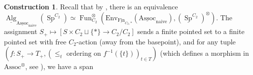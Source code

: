 \documentclass{article}
\DeclareMathOperator{\Alg}{Alg}
\DeclareMathOperator{\Fun}{Fun} %
\DeclareMathOperator{\Spectra}{Sp} %
\newcommand{\Assoc}{\mathrm{Assoc}}
\newcommand{\Fin}{\mathrm{Fin}} %
\theoremstyle{definition}
\newtheorem{construction}[equation]{Construction}
\newcommand{\Lucy}[1]{\todo[color=cyan!30]{\footnotesize L: #1}}
\begin{document}
\begin{construction}\label{cons:norm_in_families}
    Recall that by \cite[Proposition 2.8.7(1)]{NS22}, there is an equivalence $ \underline{\Alg}_{\underline{\mathrm{Assoc}}_{\mathrm{naive}}}\left(\underline{\Spectra}^{C_2}\right) \simeq \Fun^\otimes_{C_2}\left(\mathrm{Env}_{\underline{\Fin}_{C_2,*}}(\underline{\mathrm{Assoc}}_{\mathrm{naive}}), \left(\underline{\Spectra}^{C_2}\right)^\otimes\right) $. 
    The assignment $ S_+ \mapsto [S \times C_2 \sqcup \{*\} \to C_2/C_2] $ sends a finite pointed set to a finite pointed set with free $ C_2 $-action (away from the basepoint), and for any tuple $ \left(f \colon S_+ \to T_+, \left(\leq_t \text{ ordering on }f^{-1}(\{t\})\right)_{t \in T}\right) $ (which defines a morphism in $ \Assoc^\otimes $, see \cite[Remark 4.1.1.4]{LurHA}), we have a span

\end{construction}
\end{document}

